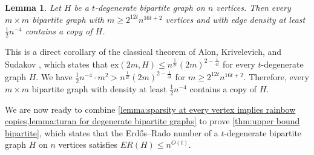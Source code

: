 \documentclass[a4paper,11pt]{article}
\makeatletter
\renewenvironment{proof}[1][\proofname] {\par\pushQED{\qed}\normalfont\topsep6\p@\@plus6\p@\relax\trivlist\item[\hskip\labelsep\bfseries#1\@addpunct{.}]\ignorespaces}{\popQED\endtrivlist\@endpefalse}
\newtheorem{lemma}[theorem]{\bf Lemma}
\theoremstyle{definition}
\def\ex{\mathrm{ex}}
\makeatother
\begin{document}
\begin{lemma}\label{lemma:turan for degenerate bipartite graphs}
Let $H$ be a $t$-degenerate bipartite graph on $n$ vertices. Then every $m \times m$ bipartite graph with $m \geq 2^{12t}n^{16t+2}$ vertices and with edge density at least $\frac 12 n^{-4}$ contains a copy of $H$.
\end{lemma}
\begin{proof}
This is a direct corollary of the classical theorem of Alon, Krivelevich, and Sudakov \cite[Theorem 3.5]{AKS03}, which states that $\ex(2m, H)\leq n^{\frac{1}{2t}}(2m)^{2-\frac{1}{4t}}$ for every $t$-degenerate graph $H$. 
We have $\frac 12 n^{-4} \cdot m^2 > n^{\frac{1}{2t}}(2m)^{2-\frac{1}{4t}}$ for $m \geq 2^{12t}n^{16t+2}$. 
Therefore, every $m \times m$ bipartite graph with density at least $\frac 12 n^{-4}$ contains a copy of $H$. 
\end{proof}

We are now ready to combine \cref{lemma:sparsity at every vertex implies rainbow copies,lemma:turan for degenerate bipartite graphs} to prove \cref{thm:upper bound bipartite}, which states that the Erd\H{o}s--Rado number of a $t$-degenerate bipartite graph $H$ on $n$ vertices satisfies $ER(H)\leq n^{O(t)}$.
\end{document}
